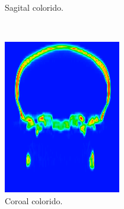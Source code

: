 \documentclass{article}
\begin{document}
\begin{figure}[H]
\begin{subfigure}[b]{0.3\textwidth}
        \caption{Sagital colorido.}
    \end{subfigure}
    ~
    \begin{subfigure}[b]{0.3\textwidth}
        \includegraphics[width=\textwidth]{skull/neuroradiologist-coronal.png}
        \caption{Coroal colorido.}
    \end{subfigure}
    ~
    \begin{subfigure}[b]{0.3\textwidth}

\end{subfigure}
\end{figure}
\end{document}
